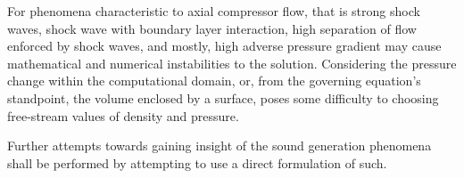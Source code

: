 For phenomena characteristic to axial compressor flow, that is strong shock waves, shock wave with boundary layer interaction, high separation of flow enforced by shock waves, and mostly, high adverse pressure gradient may cause mathematical and numerical instabilities to the solution. Considering the pressure change within the computational domain, or, from the governing equation's standpoint, the volume enclosed by a surface, poses some difficulty to choosing free-stream values of density and pressure.

Further attempts towards gaining insight of the sound generation phenomena shall be performed by attempting to use a direct formulation of such.